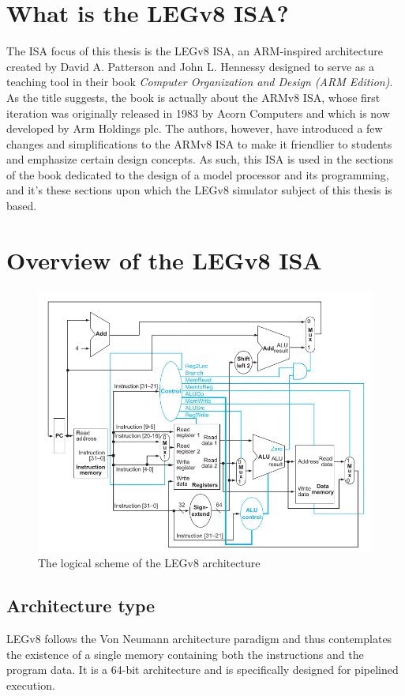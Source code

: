 \section*{What is the LEGv8 ISA?}

The ISA focus of this thesis is the LEGv8 ISA, an ARM-inspired architecture created by David A. Patterson and John L. Hennessy designed to serve as a teaching
tool in their book \emph{Computer Organization and Design (ARM Edition)}. As the title suggests, the book is actually about the ARMv8 ISA, whose first
iteration was originally released in 1983 by Acorn Computers and which is now developed by Arm Holdings plc. The authors, however, have introduced a few
changes and simplifications to the ARMv8 ISA to make it friendlier to students and emphasize certain design concepts. As such, this ISA is used
in the sections of the book dedicated to the design of a model processor and its programming, and it's these sections upon which the LEGv8 simulator
subject of this thesis is based.

\section*{Overview of the LEGv8 ISA}

\begin{figure}[H]
	\centering
	\includegraphics[width=.8\textwidth]{img/legv8_logical_scheme.png}
	\caption{The logical scheme of the LEGv8 architecture}
\end{figure}

\subsection*{Architecture type}
LEGv8 follows the Von Neumann architecture paradigm and thus contemplates the existence of a single memory containing both the instructions and the program data. It is a 64-bit architecture and is specifically designed for pipelined execution.
